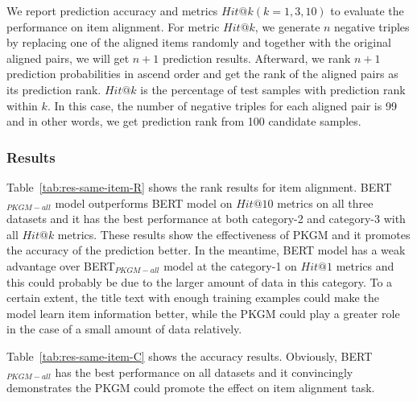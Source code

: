 We report prediction accuracy and metrics $Hit@k(k=1,3,10)$ to evaluate the performance on item alignment. For metric $Hit@k$, we generate $n$ negative triples by replacing one of the aligned items randomly and together with the original aligned pairs, we will get $n+1$ prediction results. Afterward, we rank $n+1$ prediction probabilities in ascend order and get the rank of the aligned pairs as its prediction rank. $Hit@k$ is the percentage of test samples with prediction rank within $k$. In this case, the number of negative triples for each aligned pair is 99 and in other words, we get prediction rank from 100 candidate samples.

\subsubsection{Results}

Table~\ref{tab:res-same-item-R} shows the rank results for item alignment. BERT$_{PKGM-all}$ model outperforms BERT model on $Hit@10$ metrics on all three datasets and it has the best performance at both category-2 and category-3 with all $Hit@k$ metrics. These results show the effectiveness of PKGM and it promotes the accuracy of the prediction better. In the meantime, BERT model has a weak advantage over BERT$_{PKGM-all}$ model at the category-1 on $Hit@1$ metrics and this could probably be due to the larger amount of data in this category. To a certain extent, the title text with enough training examples could make the model learn item information better, while the PKGM could play a greater role in the case of a small amount of data relatively.

Table~\ref{tab:res-same-item-C} shows the accuracy results. Obviously, BERT$_{PKGM-all}$ has the best performance on all datasets and it convincingly demonstrates the PKGM could promote the effect on item alignment task.



